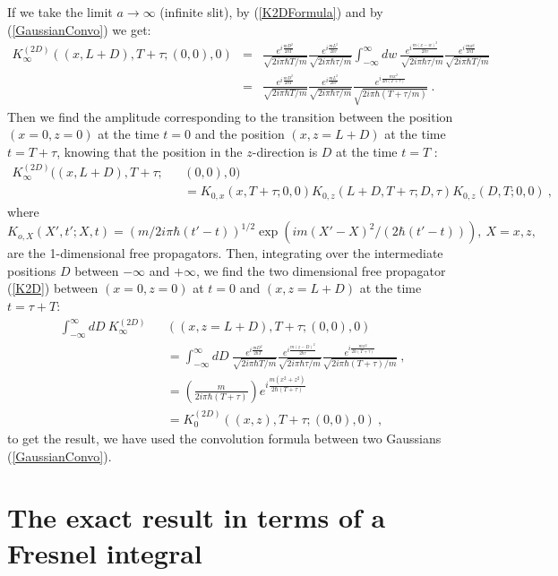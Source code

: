\documentclass[12pt,aps,prb,preprint]{revtex4-1}   %
\begin{document}
If we take the limit $a\rightarrow\infty$ (infinite slit), 
by (\ref{K2DFormula}) and by (\ref{GaussianConvo}) we get:
\begin{eqnarray*}
K_{\infty}^{(2D)}((x,L+D),T+\tau;(0,0),0)&=&\frac{e^{i\frac{mD^2}{2\hbar T}}}{\sqrt{2i\pi\hbar T/m}} 
\frac{e^{i\frac{m L^2}{2\hbar\tau}}}{\sqrt{2i\pi\hbar\tau/m}}
\int_{-\infty}^{\infty}dw\ \frac{e^{i\frac{m (x-w)^2}{2\hbar\tau}}}{\sqrt{2i\pi\hbar\tau/m}}
\frac{e^{i\frac{m w^2}{2\hbar T}}}{\sqrt{2i\pi\hbar T/m}}
{}\\{}&=&\frac{e^{i\frac{mD^2}{2\hbar T}}}{\sqrt{2i\pi\hbar T/m}} 
\frac{e^{i\frac{m L^2}{2\hbar\tau}}}{\sqrt{2i\pi\hbar\tau/m}}
\frac{e^{i\frac{m x^2}{2\hbar (T+\tau)}}}{\sqrt{2i\pi\hbar (T+\tau/m)}}\ .
\end{eqnarray*}
Then we find the amplitude corresponding to the transition
between the position $(x=0,z=0)$ at the time $t=0$ 
and the position $(x,z=L+D)$ at the time $t=T+\tau$, 
knowing that the position in the $z$-direction is $D$ at the time $t=T$ :
\begin{eqnarray*}
K_{\infty}^{(2D)}((x,L+D),T+\tau;&&(0,0),0)
{}\\{}&&=K_{0,x}\left(x,T+\tau;0,0\right)K_{0,z}\left(L+D,T+\tau;D,\tau\right)K_{0,z}\left(D,T;0,0\right)\ ,
\end{eqnarray*}
where $K_{o,X}(X',t';X,t)=(m/2i\pi\hbar(t'-t))^{1/2}\exp{\left(im(X'-X)^2/(2\hbar(t'-t))\right)},\ X=x,z,$ 
are the 1-dimensional free propagators.
Then, integrating over the intermediate positions $D$ between $-\infty$ and $+\infty$,
we find the two dimensional free propagator (\ref{K2D}) between $(x=0,z=0)$ at $t=0$
and $(x,z=L+D)$ at the time $t=\tau+T$:
\begin{eqnarray*}
\int_{-\infty}^{\infty}dD\ K_{\infty}^{(2D)}&&((x,z=L+D),T+\tau;(0,0),0)
{}\\{}&&=\int_{-\infty}^{\infty}dD\ \frac{e^{i\frac{mD^2}{2\hbar T}}}{\sqrt{2i\pi\hbar T/m}} 
\frac{e^{i\frac{m (z-D)^2}{2\hbar\tau}}}{\sqrt{2i\pi\hbar\tau/m}}
\frac{e^{i\frac{m x^2}{2\hbar (T+\tau)}}}{\sqrt{2i\pi\hbar (T+\tau)/m}}\ ,
{}\\{}&&=\left(\frac{m}{2i\pi\hbar (T+\tau)}\right)e^{i\frac{m (x^2+z^2)}{2\hbar (T+\tau)}}
{}\\{}&&= K_0^{(2D)}((x,z),T+\tau;(0,0),0)\ ,
\end{eqnarray*} 
to get the result, we have used the convolution formula between two Gaussians (\ref{GaussianConvo}).

\section{The exact result in terms of a Fresnel integral}
\end{document}
